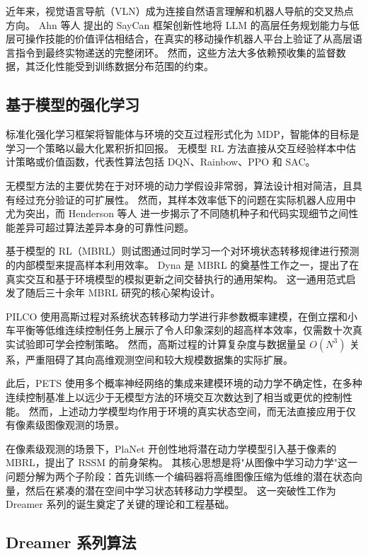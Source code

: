 \documentclass[12pt,a4paper]{ctexart}
\begin{document}
近年来，视觉语言导航（VLN）成为连接自然语言理解和机器人导航的交叉热点方向。
Ahn 等人\cite{ahn2022can} 提出的 SayCan 框架创新性地将 LLM 的高层任务规划能力与低层可操作技能的价值评估相结合，在真实的移动操作机器人平台上验证了从高层语言指令到最终实物递送的完整闭环。
然而，这些方法大多依赖预收集的监督数据，其泛化性能受到训练数据分布范围的约束。

\subsection{基于模型的强化学习}

标准化强化学习框架将智能体与环境的交互过程形式化为 MDP\cite{sutton2018reinforcement}，智能体的目标是学习一个策略以最大化累积折扣回报。
无模型 RL 方法直接从交互经验样本中估计策略或价值函数，代表性算法包括 DQN、Rainbow、PPO 和 SAC。

无模型方法的主要优势在于对环境的动力学假设非常弱，算法设计相对简洁，且具有经过充分验证的可扩展性。
然而，其样本效率低下的问题在实际机器人应用中尤为突出，而 Henderson 等人\cite{henderson2018deep} 进一步揭示了不同随机种子和代码实现细节之间性能差异可超过算法差异本身的可靠性问题。

基于模型的 RL（MBRL）则试图通过同时学习一个对环境状态转移规律进行预测的内部模型来提高样本利用效率。
Dyna\cite{sutton1990dyna} 是 MBRL 的奠基性工作之一，提出了在真实交互和基于环境模型的模拟更新之间交替执行的通用架构。
这一通用范式启发了随后三十余年 MBRL 研究的核心架构设计。

PILCO\cite{deisenroth2011pilco} 使用高斯过程对系统状态转移动力学进行非参数概率建模，在倒立摆和小车平衡等低维连续控制任务上展示了令人印象深刻的超高样本效率，仅需数十次真实试验即可学会控制策略。
然而，高斯过程的计算复杂度与数据量呈 $O(N^3)$ 关系，严重阻碍了其向高维观测空间和较大规模数据集的实际扩展。

此后，PETS\cite{chua2018deep} 使用多个概率神经网络的集成来建模环境的动力学不确定性，在多种连续控制基准上以远少于无模型方法的环境交互次数达到了相当或更优的控制性能。
然而，上述动力学模型均作用于环境的真实状态空间，而无法直接应用于仅有像素级图像观测的场景。

在像素级观测的场景下，PlaNet\cite{hafner2019planet} 开创性地将潜在动力学模型引入基于像素的 MBRL，提出了 RSSM 的前身架构。
其核心思想是将"从图像中学习动力学"这一问题分解为两个子阶段：首先训练一个编码器将高维图像压缩为低维的潜在状态向量，然后在紧凑的潜在空间中学习状态转移动力学模型。
这一突破性工作为 Dreamer 系列的诞生奠定了关键的理论和工程基础。

\subsection{Dreamer 系列算法}
\end{document}
